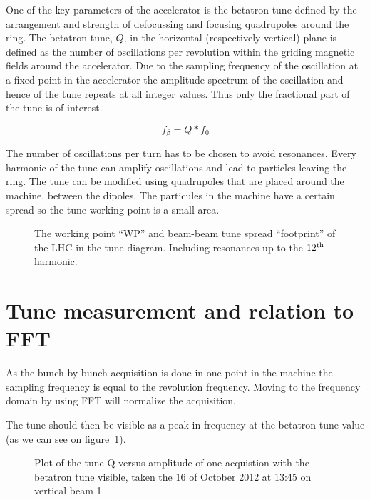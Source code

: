 One of the key parameters of the accelerator is the betatron tune defined by the arrangement and strength of defocussing and focusing quadrupoles around the ring. The betatron tune, $Q$, in the horizontal (respectively vertical) plane is defined as the number of oscillations per revolution within the griding magnetic fields around the accelerator. Due to the sampling frequency of the oscillation at a fixed point in the accelerator the amplitude spectrum of the oscillation and hence of the tune repeats at all integer values. Thus only the fractional part of the tune is of interest.

$$ f_{\beta} = Q * f_{0} $$

The number of oscillations per turn has to be chosen to avoid resonances. Every harmonic of the tune can amplify oscillations and lead to particles leaving the ring. The tune can be modified using quadrupoles that are placed around the machine, between the dipoles. The particules in the machine have a certain spread so the tune working point is a small area.

\begin{figure}[H]
\centering
\caption{The working point ``WP'' and beam-beam tune spread ``footprint'' of the LHC in the tune diagram. Including resonances up to the $12^{\rm {th}}$ harmonic.}
\end{figure}

\section{Tune measurement and relation to FFT}

As the bunch-by-bunch acquisition is done in one point in the machine the sampling frequency is equal to the revolution frequency. Moving to the frequency domain by using \gls{FFT} will normalize the acquisition.

The tune should then be visible as a peak in frequency at the betatron tune value (as we can see on figure~\ref{fig:tune_single}).

\begin{figure}[H]
\centering
\caption{Plot of the tune Q versus amplitude of one acquistion with the betatron tune visible, taken the 16 of October 2012 at 13:45 on vertical beam 1}
\label{fig:tune_single}
\end{figure}

